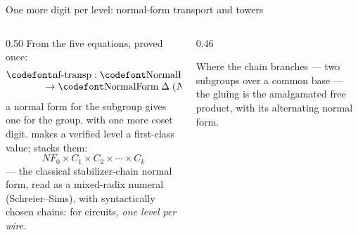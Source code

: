 \begin{frame}{One more digit per level: normal-form transport and towers}
\begin{columns}[c]
\begin{column}{0.50\textwidth}
From the five equations, proved once:
\[
\begin{array}{@{}l@{}}
  \aid{nf-transp} : \aid{NormalForm}\;\Gamma\;\mathit{NF}\\
  \qquad\qquad\to \aid{NormalForm}\;\Delta\;(\mathit{NF}\times C)
\end{array}
\]
\small a normal form for the subgroup gives one for the group, \alert{with one more
coset digit}.  makes a verified level a first-class value;
 stacks them:
\[
  \mathit{NF}_0 \times C_1 \times C_2 \times \cdots \times C_k
\]
--- the classical stabilizer-chain normal form, read as a \alert{mixed-radix
numeral} (Schreier--Sims), with syntactically chosen chains: for circuits,
\emph{one level per wire}.
\end{column}
\begin{column}{0.46\textwidth}
\centering
{}

\vspace{6pt}
{\small Where the chain \alert{branches} --- two subgroups over a common base ---
the gluing is the amalgamated free product, with its alternating normal form.}
\end{column}
\end{columns}
\end{frame}
